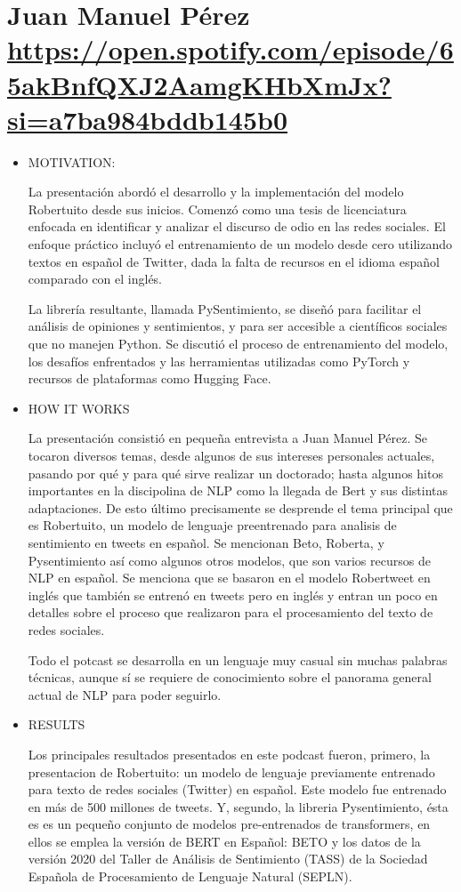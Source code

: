 \documentclass[letter, 11pt, twoside]{report}
\begin{document}
\section*{Juan Manuel Pérez  \color{mirosa}\url{https://open.spotify.com/episode/65akBnfQXJ2AamgKHbXmJx?si=a7ba984bddb145b0}}
\begin{itemize}
    \item MOTIVATION:
    
    La presentación abordó el desarrollo y la implementación del modelo Robertuito desde sus inicios. Comenzó como una tesis de licenciatura enfocada en identificar y analizar el discurso de odio en las redes sociales. El enfoque práctico incluyó el entrenamiento de un modelo desde cero utilizando textos en español de Twitter, dada la falta de recursos en el idioma español comparado con el inglés.
    
    La librería resultante, llamada PySentimiento, se diseñó para facilitar el análisis de opiniones y sentimientos, y para ser accesible a científicos sociales que no manejen Python. Se discutió el proceso de entrenamiento del modelo, los desafíos enfrentados y las herramientas utilizadas como PyTorch y recursos de plataformas como Hugging Face.
    \item HOW IT WORKS
    
    La presentación consistió en pequeña entrevista a Juan Manuel Pérez. Se tocaron diversos temas, desde algunos de sus intereses personales actuales, pasando por qué y para qué sirve realizar un doctorado; hasta algunos hitos importantes en la discipolina de NLP como la llegada de Bert y sus distintas adaptaciones. De esto último precisamente se desprende el tema principal que es Robertuito, un modelo de lenguaje preentrenado para analisis de sentimiento en tweets en español. Se mencionan Beto, Roberta, y Pysentimiento así como algunos otros modelos, que son varios recursos de NLP en español.
    Se menciona que se basaron en el modelo Robertweet en inglés que también se entrenó en tweets pero en inglés y entran un poco en detalles sobre el proceso que realizaron para el procesamiento del texto de redes sociales.

    Todo el potcast se desarrolla en un lenguaje muy casual sin muchas palabras técnicas, aunque sí se requiere de conocimiento sobre el panorama general actual de NLP para poder seguirlo.


    \item RESULTS
    
    Los principales resultados presentados en este podcast fueron, primero, la presentacion de Robertuito: un modelo de lenguaje previamente entrenado para texto de redes sociales (Twitter) en español. Este modelo fue entrenado en más de 500 millones de tweets. Y, segundo, la libreria Pysentimiento, ésta es es un pequeño conjunto de modelos pre-entrenados de transformers, en ellos se emplea la versión de BERT en Español: BETO y los datos de la versión 2020 del Taller de Análisis de Sentimiento (TASS) de la Sociedad Española de Procesamiento de Lenguaje Natural (SEPLN).


\end{itemize}
\end{document}
